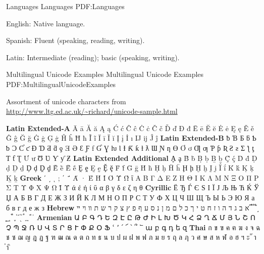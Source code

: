 \documentclass[letterpaper,MMMyyyy,nonstopmode]{simpleresumecv}
\begin{document}
\begin{Body}
{{%

\Section
{Languages}
{Languages}
{PDF:Languages}

\BulletItem
English: Native language.

\Gap
\BulletItem
Spanish: Fluent (speaking, reading, writing).

\Gap
\BulletItem
Latin: Intermediate (reading); basic (speaking, writing).





\Section
{Multilingual Unicode Examples}
{Multilingual Unicode Examples}
{PDF:MultilingualUnicodeExamples}

\BulletItem
Assortment of unicode characters from
\href{http://www.ltg.ed.ac.uk/~richard/unicode-sample.html}
{\url{http://www.ltg.ed.ac.uk/~richard/unicode-sample.html}}

\begin{Detail}
\Item
\textbf{Latin Extended-A}
Ā ā Ă ă Ą ą Ć ć Ĉ ĉ Ċ ċ Č č Ď ď Đ đ Ē ē Ĕ ĕ Ė ė Ę ę Ě ě Ĝ ĝ Ğ ğ Ġ ġ Ģ ģ Ĥ ĥ Ħ ħ Ĩ ĩ Ī ī Ĭ ĭ Į į İ ı Ĳ ĳ Ĵ ĵ
\textbf{Latin Extended-B}
ƀ Ɓ Ƃ ƃ Ƅ ƅ Ɔ Ƈ ƈ Ɖ Ɗ Ƌ ƌ ƍ Ǝ Ə Ɛ Ƒ ƒ Ɠ Ɣ ƕ Ɩ Ɨ Ƙ ƙ ƚ ƛ Ɯ Ɲ ƞ Ɵ Ơ ơ Ƣ ƣ Ƥ ƥ Ʀ Ƨ ƨ Ʃ ƪ ƫ Ƭ ƭ Ʈ Ư ư Ʊ Ʋ Ƴ ƴ Ƶ
\textbf{Latin Extended Additional}
Ḁ ḁ Ḃ ḃ Ḅ ḅ Ḇ ḇ Ḉ ḉ Ḋ ḋ Ḍ ḍ Ḏ ḏ Ḑ ḑ Ḓ ḓ Ḕ ḕ Ḗ ḗ Ḙ ḙ Ḛ ḛ Ḝ ḝ Ḟ ḟ Ḡ ḡ Ḣ ḣ Ḥ ḥ Ḧ ḧ Ḩ ḩ Ḫ ḫ Ḭ ḭ Ḯ ḯ Ḱ ḱ Ḳ ḳ Ḵ ḵ
\textbf{Greek}
ʹ ͵ ͺ ; ΄ ΅ Ά · Έ Ή Ί Ό Ύ Ώ ΐ Α Β Γ Δ Ε Ζ Η Θ Ι Κ Λ Μ Ν Ξ Ο Π Ρ Σ Τ Υ Φ Χ Ψ Ω Ϊ Ϋ ά έ ή ί ΰ α β γ δ ε ζ η θ
\textbf{Cyrillic}
Ё Ђ Ѓ Є Ѕ І Ї Ј Љ Њ Ћ Ќ Ў Џ А Б В Г Д Е Ж З И Й К Л М Н О П Р С Т У Ф Х Ц Ч Ш Щ Ъ Ы Ь Э Ю Я а б в г д е ж з
\textbf{Hebrew}
א ב ג ד ה ו ז ח ט י ך כ ל ם מ ן נ ס ע ף פ ץ צ ק ר ש ת װ ױ ײ ֝ ֞ ֟ ֠ ֡ ֣ ֤ ֥ ֦ ֧ ֨ ֩ ֪ ֫ ֬ ֭ ֮ ֯ ְ ֱ ֒ ֓ ֔
\textbf{Armenian}
{\UseSecondaryFont
Ա Բ Գ Դ Ե Զ Է Ը Թ Ժ Ի Լ Խ Ծ Կ Հ Ձ Ղ Ճ Մ Յ Ն Շ Ո Չ Պ Ջ Ռ Ս Վ Տ Ր Ց Ւ Փ Ք Օ Ֆ ՙ ՚ ՛ ՜ ՝ ՞ ՟ ա բ գ դ ե զ}
\textbf{Thai}
{\UseSecondaryFont
ก ข ฃ ค ฅ ฆ ง จ ฉ ช ซ ฌ ญ ฎ ฏ ฐ ฑ ฒ ณ ด ต ถ ท ธ น บ ป ผ ฝ พ ฟ ภ ม ย ร ฤ ล ฦ ว ศ ษ ส ห ฬ อ ฮ ฯ ะ ั า ำ ิ}
\end{Detail}

\newpage


\begingroup
\color{red}

}}
\end{Body}
\end{document}
